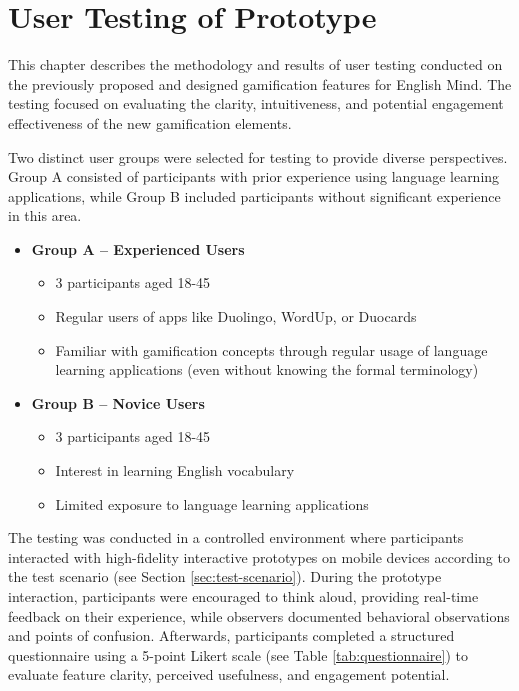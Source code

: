 \chapter{User Testing of Prototype}

This chapter describes the methodology and results of user testing conducted on the previously proposed and designed gamification features for English Mind. The testing focused on evaluating the clarity, intuitiveness, and potential engagement effectiveness of the new gamification elements.

Two distinct user groups were selected for testing to provide diverse perspectives. Group A consisted of participants with prior experience using language learning applications, while Group B included participants without significant experience in this area.
\begin{itemize}
    \item \textbf{Group A – Experienced Users}
    \begin{itemize}
        \item 3 participants aged 18-45
        \item Regular users of apps like Duolingo, WordUp, or Duocards
        \item Familiar with gamification concepts through regular usage of language learning applications (even without knowing the formal terminology)
    \end{itemize}

    \item \textbf{Group B – Novice Users}
    \begin{itemize}
        \item 3 participants aged 18-45
        \item Interest in learning English vocabulary
        \item Limited exposure to language learning applications
    \end{itemize}
\end{itemize}

The testing was conducted in a controlled environment where participants interacted with high-fidelity interactive prototypes on mobile devices according to the test scenario (see Section \ref{sec:test-scenario}). During the prototype interaction, participants were encouraged to think aloud, providing real-time feedback on their experience, while observers documented behavioral observations and points of confusion. Afterwards, participants completed a structured questionnaire using a 5-point Likert scale (see Table \ref{tab:questionnaire}) to evaluate feature clarity, perceived usefulness, and engagement potential.

